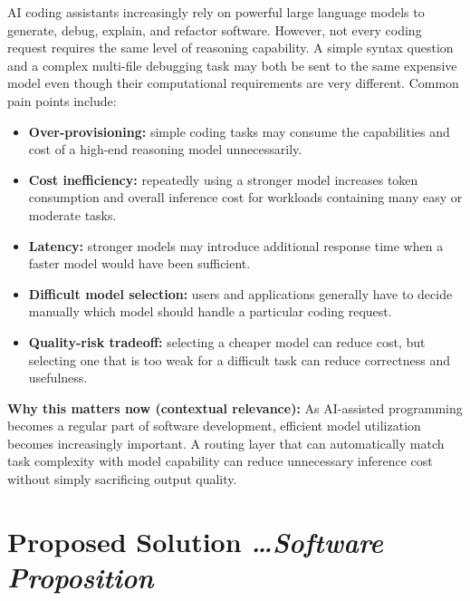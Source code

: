 \documentclass[11pt,a4paper]{article}
\newcommand{\BvrHint}[1]{%
  {\normalfont\normalsize\itshape\hfill #1}%
}
\begin{document}
AI coding assistants increasingly rely on powerful large
language models to generate, debug, explain, and refactor
software. However, not every coding request requires the
same level of reasoning capability. A simple syntax question
and a complex multi-file debugging task may both be sent to
the same expensive model even though their computational
requirements are very different. Common pain points include:

\begin{itemize}[leftmargin=0.7cm]

    \item \textbf{Over-provisioning:} simple coding tasks may
    consume the capabilities and cost of a high-end reasoning
    model unnecessarily.

    \item \textbf{Cost inefficiency:} repeatedly using a
    stronger model increases token consumption and overall
    inference cost for workloads containing many easy or
    moderate tasks.

    \item \textbf{Latency:} stronger models may introduce
    additional response time when a faster model would have
    been sufficient.

    \item \textbf{Difficult model selection:} users and
    applications generally have to decide manually which
    model should handle a particular coding request.

    \item \textbf{Quality-risk tradeoff:} selecting a cheaper
    model can reduce cost, but selecting one that is too weak
    for a difficult task can reduce correctness and usefulness.

\end{itemize}

\textbf{Why this matters now (contextual relevance):}
As AI-assisted programming becomes a regular part of software
development, efficient model utilization becomes increasingly
important. A routing layer that can automatically match task
complexity with model capability can reduce unnecessary
inference cost without simply sacrificing output quality.

\section{Proposed Solution%
  \texorpdfstring{\BvrHint{\ldots Software Proposition}}{}}
\end{document}

